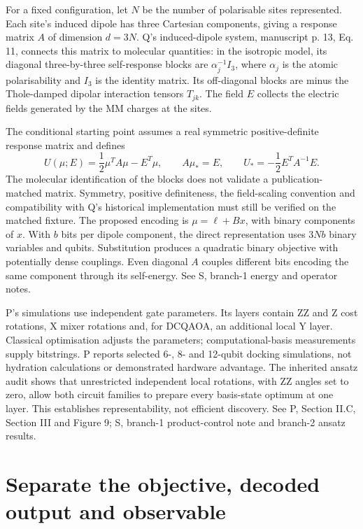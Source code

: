 \documentclass{article}
\begin{document}
For a fixed configuration, let $N$ be the number of polarisable sites represented. Each site's induced dipole has three Cartesian components, giving a response matrix $A$ of dimension $d=3N$. Q's induced-dipole system, manuscript p. 13, Eq. 11, connects this matrix to molecular quantities: in the isotropic model, its diagonal three-by-three self-response blocks are $\alpha_j^{-1}I_3$, where $\alpha_j$ is the atomic polarisability and $I_3$ is the identity matrix. Its off-diagonal blocks are minus the Thole-damped dipolar interaction tensors $T_{jk}$. The field $E$ collects the electric fields generated by the MM charges at the sites.

The conditional starting point assumes a real symmetric positive-definite response matrix and defines
\begin{equation}
U(\mu;E)=\frac12\mu^TA\mu-E^T\mu,\qquad A\mu_*=E,\qquad U_*=-\frac12E^TA^{-1}E.
\end{equation}
The molecular identification of the blocks does not validate a publication-matched matrix. Symmetry, positive definiteness, the field-scaling convention and compatibility with Q's historical implementation must still be verified on the matched fixture. The proposed encoding is $\mu=\ell+Bx$, with binary components of $x$. With $b$ bits per dipole component, the direct representation uses $3Nb$ binary variables and qubits. Substitution produces a quadratic binary objective with potentially dense couplings. Even diagonal $A$ couples different bits encoding the same component through its self-energy. See S, branch-1 energy and operator notes.

P's simulations use independent gate parameters. Its layers contain ZZ and Z cost rotations, X mixer rotations and, for DCQAOA, an additional local Y layer. Classical optimisation adjusts the parameters; computational-basis measurements supply bitstrings. P reports selected 6-, 8- and 12-qubit docking simulations, not hydration calculations or demonstrated hardware advantage. The inherited ansatz audit shows that unrestricted independent local rotations, with ZZ angles set to zero, allow both circuit families to prepare every basis-state optimum at one layer. This establishes representability, not efficient discovery. See P, Section II.C, Section III and Figure 9; S, branch-1 product-control note and branch-2 ansatz results.

\section{Separate the objective, decoded output and observable}
\end{document}

